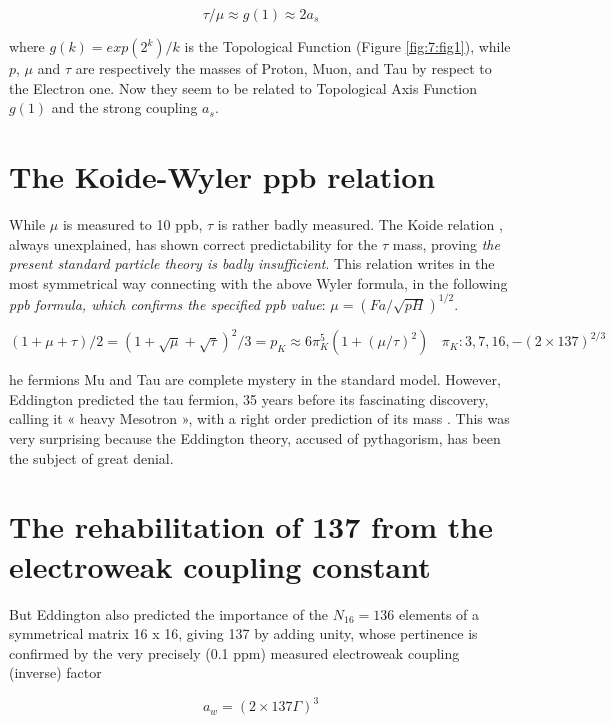 \documentclass[a4paper,9pt]{article}
\begin{document}
\begin{equation}
\tau/\mu   \approx g(1) \approx  2a_s
\end{equation}

where $g(k) = exp(2^k)/k$ is the Topological Function (Figure \ref{fig:7:fig1}), while $p$, $\mu$ and $\tau$ are respectively the masses of Proton, Muon, and Tau by respect to the Electron one.  Now they seem to be related to Topological Axis Function $g(1)$ and the strong coupling $a_s$.


\section {The Koide-Wyler ppb relation}

While $\mu$ is measured to 10 ppb, $\tau$ is rather badly measured. The Koide relation \cite{Koide}, always unexplained, has shown correct predictability for the $\tau$ mass, proving \textit{the present standard particle theory is badly insufficient}. This relation writes in the most symmetrical way connecting with the above Wyler formula, in the following \textit{ppb formula, which confirms the specified ppb value}: $\mu = (Fa/\sqrt{pH})^{1/2}$\cite{Sanchez}.


\begin{equation}
(1 + \mu + \tau)/2 = (1 + \sqrt{\mu} + \sqrt{\tau})^2/3 = p_K \approx 6\pi_K^5 (1+(\mu / \tau)^2) ~~~~\pi_K: 3,7,16,-(2\times 137)^{2/3}
\end{equation}

he fermions Mu and Tau are complete mystery in the standard model. However, Eddington predicted the tau fermion, 35 years before its fascinating discovery, calling it « heavy Mesotron », with a right order prediction of its mass \cite{Eddington}.  This was very surprising because the Eddington theory, accused of pythagorism, has been the subject of great denial.

\section{The rehabilitation of 137 from the electroweak coupling constant}

But Eddington also predicted the importance of the $N_{16} = 136$ elements of a symmetrical matrix 16 x 16, giving 137 by adding unity, whose pertinence is confirmed by the very precisely (0.1 ppm) measured electroweak coupling (inverse) factor 

\begin{equation}
a_w = (2\times137 \Gamma)^3
\end{equation}
 
\end{document}

